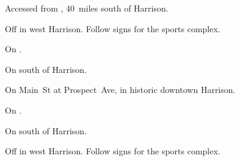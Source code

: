 
\begin{LocationList}

Accessed from , 40~miles south of Harrison.

Off    in west Harrison.
Follow signs for the sports complex.

On   .

On    south of Harrison.

On Main~St at Prospect~Ave, in historic downtown Harrison.

On   .

\Location{\TruckStop \Gas \Rest \Service \Weigh}
On  south of Harrison.

Off    in west Harrison.
Follow signs for the sports complex.

\end{LocationList}
